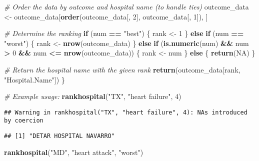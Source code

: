 \documentclass[
]{article}
\newenvironment{Shaded}{\begin{snugshade}}{\end{snugshade}}
\newcommand{\CommentTok}[1]{\textcolor[rgb]{0.56,0.35,0.01}{\textit{#1}}}
\newcommand{\ConstantTok}[1]{\textcolor[rgb]{0.56,0.35,0.01}{#1}}
\newcommand{\ControlFlowTok}[1]{\textcolor[rgb]{0.13,0.29,0.53}{\textbf{#1}}}
\newcommand{\DecValTok}[1]{\textcolor[rgb]{0.00,0.00,0.81}{#1}}
\newcommand{\FunctionTok}[1]{\textcolor[rgb]{0.13,0.29,0.53}{\textbf{#1}}}
\newcommand{\NormalTok}[1]{#1}
\newcommand{\OtherTok}[1]{\textcolor[rgb]{0.56,0.35,0.01}{#1}}
\newcommand{\SpecialCharTok}[1]{\textcolor[rgb]{0.81,0.36,0.00}{\textbf{#1}}}
\newcommand{\StringTok}[1]{\textcolor[rgb]{0.31,0.60,0.02}{#1}}
\begin{document}
\begin{Shaded}
\begin{Highlighting}[]
  \CommentTok{\# Order the data by outcome and hospital name (to handle ties)}
\NormalTok{  outcome\_data }\OtherTok{\textless{}{-}}\NormalTok{ outcome\_data[}\FunctionTok{order}\NormalTok{(outcome\_data[, }\DecValTok{2}\NormalTok{], outcome\_data[, }\DecValTok{1}\NormalTok{]), ]}
  
  \CommentTok{\# Determine the ranking}
  \ControlFlowTok{if}\NormalTok{ (num }\SpecialCharTok{==} \StringTok{"best"}\NormalTok{) \{}
\NormalTok{    rank }\OtherTok{\textless{}{-}} \DecValTok{1}
\NormalTok{  \} }\ControlFlowTok{else} \ControlFlowTok{if}\NormalTok{ (num }\SpecialCharTok{==} \StringTok{"worst"}\NormalTok{) \{}
\NormalTok{    rank }\OtherTok{\textless{}{-}} \FunctionTok{nrow}\NormalTok{(outcome\_data)}
\NormalTok{  \} }\ControlFlowTok{else} \ControlFlowTok{if}\NormalTok{ (}\FunctionTok{is.numeric}\NormalTok{(num) }\SpecialCharTok{\&\&}\NormalTok{ num }\SpecialCharTok{\textgreater{}} \DecValTok{0} \SpecialCharTok{\&\&}\NormalTok{ num }\SpecialCharTok{\textless{}=} \FunctionTok{nrow}\NormalTok{(outcome\_data)) \{}
\NormalTok{    rank }\OtherTok{\textless{}{-}}\NormalTok{ num}
\NormalTok{  \} }\ControlFlowTok{else}\NormalTok{ \{}
    \FunctionTok{return}\NormalTok{(}\ConstantTok{NA}\NormalTok{)}
\NormalTok{  \}}
  
  \CommentTok{\# Return the hospital name with the given rank}
  \FunctionTok{return}\NormalTok{(outcome\_data[rank, }\StringTok{"Hospital.Name"}\NormalTok{])}
\NormalTok{\}}

\CommentTok{\# Example usage:}
\FunctionTok{rankhospital}\NormalTok{(}\StringTok{"TX"}\NormalTok{, }\StringTok{"heart failure"}\NormalTok{, }\DecValTok{4}\NormalTok{)}
\end{Highlighting}
\end{Shaded}

\begin{verbatim}
## Warning in rankhospital("TX", "heart failure", 4): NAs introduced by coercion
\end{verbatim}

\begin{verbatim}
## [1] "DETAR HOSPITAL NAVARRO"
\end{verbatim}

\begin{Shaded}
\begin{Highlighting}[]
\FunctionTok{rankhospital}\NormalTok{(}\StringTok{"MD"}\NormalTok{, }\StringTok{"heart attack"}\NormalTok{, }\StringTok{"worst"}\NormalTok{)}
\end{Highlighting}
\end{Shaded}
\end{document}
